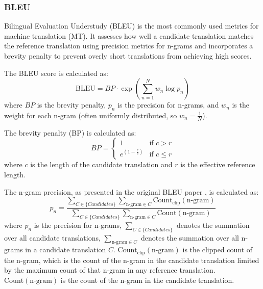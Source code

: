 \documentclass[a4paper]{article}
\begin{document}
\subsubsection{BLEU}

Bilingual Evaluation Understudy (BLEU) \cite{papieni-2002-bleu} is the most commonly used metrics for machine translation (MT). It assesses how well a candidate translation matches the reference translation using precision metrics for n-grams and incorporates a brevity penalty to prevent overly short translations from achieving high scores.

The BLEU score is calculated as:
\begin{equation}
    \text{BLEU} = BP \cdot \exp \left( \sum_{n=1}^{N} w_n \log p_n \right)
\end{equation}
where \( BP \) is the brevity penalty, \( p_n \) is the precision for n-grams, and \( w_n \) is the weight for each n-gram (often uniformly distributed, so \( w_n = \frac{1}{N} \)).

The brevity penalty (BP) is calculated as:
\begin{equation}
    BP = \begin{cases}
        1                     & \text{if } c > r    \\
        e^{(1 - \frac{r}{c})} & \text{if } c \leq r
    \end{cases}
\end{equation}
where \( c \) is the length of the candidate translation and \( r \) is the effective reference length.

The n-gram precision, as presented in the original BLEU paper \cite{papieni-2002-bleu}, is calculated as:
\begin{equation}
    p_n = \frac{\sum_{C \in \{Candidates\}} \sum_{\text{n-gram} \in C} \text{Count}_{\text{clip}}(\text{n-gram})}{\sum_{C \in \{Candidates\}} \sum_{\text{n-gram} \in C} \text{Count}(\text{n-gram})}
\end{equation}
where \( p_n \) is the precision for n-grams, \( \sum_{C \in \{Candidates\}} \) denotes the summation over all candidate translations, \( \sum_{\text{n-gram} \in C} \) denotes the summation over all n-grams in a candidate translation \( C \). \( \text{Count}_{\text{clip}}(\text{n-gram}) \) is the clipped count of the n-gram, which is the count of the n-gram in the candidate translation limited by the maximum count of that n-gram in any reference translation. \( \text{Count}(\text{n-gram}) \) is the count of the n-gram in the candidate translation.
\end{document}

